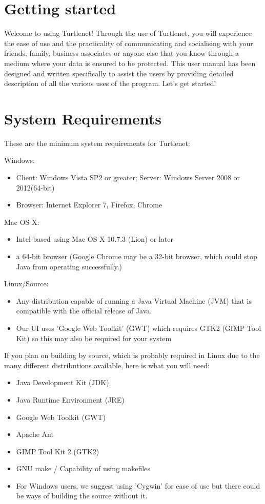 \section{Getting started}
Welcome to using Turtlenet!  Through the use of Turtlenet, you will experience
the ease of use and the practicality of communicating and socialising with your
friends, family, business associates or anyone else that you know through a
medium where your data is ensured to be protected.  This user manual has been
designed and written specifically to assist the users by providing detailed
description of all the various uses of the program.  Let's get started!

\section{System Requirements}
These are the minimum system requirements for Turtlenet:

Windows:
\begin{itemize}
\item Client: Windows Vista SP2 or greater; Server: Windows Server 2008 or 
      2012(64-bit)
\item Browser: Internet Explorer 7, Firefox, Chrome
\end{itemize}

Mac OS X:
\begin{itemize}
\item Intel-based using Mac OS X 10.7.3 (Lion) or later
\item a 64-bit browser (Google Chrome may be a 32-bit browser, which could stop
                        Java from operating successfully.)
\end{itemize}

Linux/Source:
\begin{itemize}
\item Any distribution capable of running a Java Virtual Machine (JVM) that is
      compatible with the official release of Java.
\item Our UI uses 'Google Web Toolkit' (GWT) which requires GTK2 (GIMP Tool Kit)
      so this may also be required for your system
\end{itemize}

If you plan on building by source, which is probably required in Linux due to
the many different distributions available, here is what you will need:
\begin{itemize}
\item Java Development Kit (JDK)
\item Java Runtime Environment (JRE)
\item Google Web Toolkit (GWT)
\item Apache Ant
\item GIMP Tool Kit 2 (GTK2)
\item GNU make / Capability of using makefiles
\item For Windows users, we suggest using 'Cygwin' for ease of use but there
      could be ways of building the source without it.
\end{itemize}

